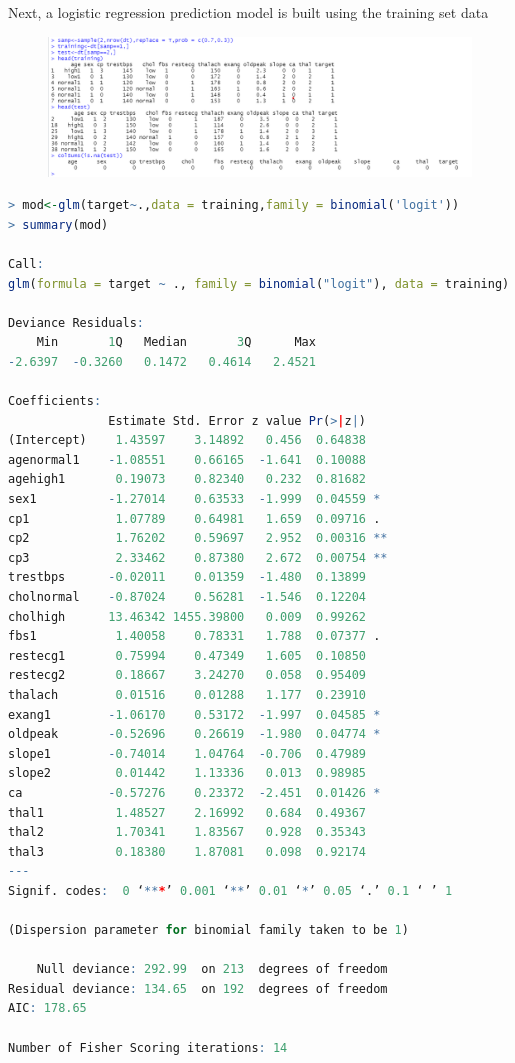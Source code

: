 \documentclass{article}
\begin{document}
Next, a logistic regression prediction model is built using the training set data
\begin{figure}[H]
  \centering
  \includegraphics[width=1\textwidth]{task1_1_dataDivide.png}
\end{figure}

\begin{lstlisting}[language=R]
> mod<-glm(target~.,data = training,family = binomial('logit'))
> summary(mod)

Call:
glm(formula = target ~ ., family = binomial("logit"), data = training)

Deviance Residuals: 
    Min       1Q   Median       3Q      Max  
-2.6397  -0.3260   0.1472   0.4614   2.4521  

Coefficients:
              Estimate Std. Error z value Pr(>|z|)   
(Intercept)    1.43597    3.14892   0.456  0.64838   
agenormal1    -1.08551    0.66165  -1.641  0.10088   
agehigh1       0.19073    0.82340   0.232  0.81682   
sex1          -1.27014    0.63533  -1.999  0.04559 * 
cp1            1.07789    0.64981   1.659  0.09716 . 
cp2            1.76202    0.59697   2.952  0.00316 **
cp3            2.33462    0.87380   2.672  0.00754 **
trestbps      -0.02011    0.01359  -1.480  0.13899   
cholnormal    -0.87024    0.56281  -1.546  0.12204   
cholhigh      13.46342 1455.39800   0.009  0.99262   
fbs1           1.40058    0.78331   1.788  0.07377 . 
restecg1       0.75994    0.47349   1.605  0.10850   
restecg2       0.18667    3.24270   0.058  0.95409   
thalach        0.01516    0.01288   1.177  0.23910   
exang1        -1.06170    0.53172  -1.997  0.04585 * 
oldpeak       -0.52696    0.26619  -1.980  0.04774 * 
slope1        -0.74014    1.04764  -0.706  0.47989   
slope2         0.01442    1.13336   0.013  0.98985   
ca            -0.57276    0.23372  -2.451  0.01426 * 
thal1          1.48527    2.16992   0.684  0.49367   
thal2          1.70341    1.83567   0.928  0.35343   
thal3          0.18380    1.87081   0.098  0.92174   
---
Signif. codes:  0 ‘***’ 0.001 ‘**’ 0.01 ‘*’ 0.05 ‘.’ 0.1 ‘ ’ 1

(Dispersion parameter for binomial family taken to be 1)

    Null deviance: 292.99  on 213  degrees of freedom
Residual deviance: 134.65  on 192  degrees of freedom
AIC: 178.65

Number of Fisher Scoring iterations: 14
\end{lstlisting} 
\end{document}
